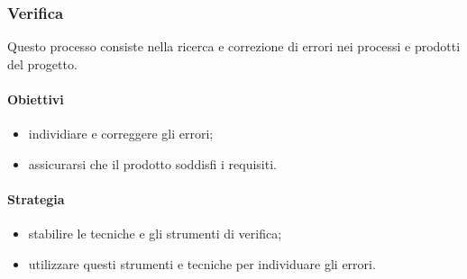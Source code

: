     \subsubsection{Verifica}
        Questo processo consiste nella ricerca e correzione di errori nei processi e prodotti del progetto.
        \paragraph{Obiettivi}
            \begin{itemize}
                \item individiare e correggere gli errori;
                \item assicurarsi che il prodotto soddisfi i requisiti.
            \end{itemize}
        \paragraph{Strategia}
            \begin{itemize}
                \item stabilire le tecniche e gli strumenti di verifica;
                \item utilizzare questi strumenti e tecniche per individuare gli errori.
            \end{itemize}

